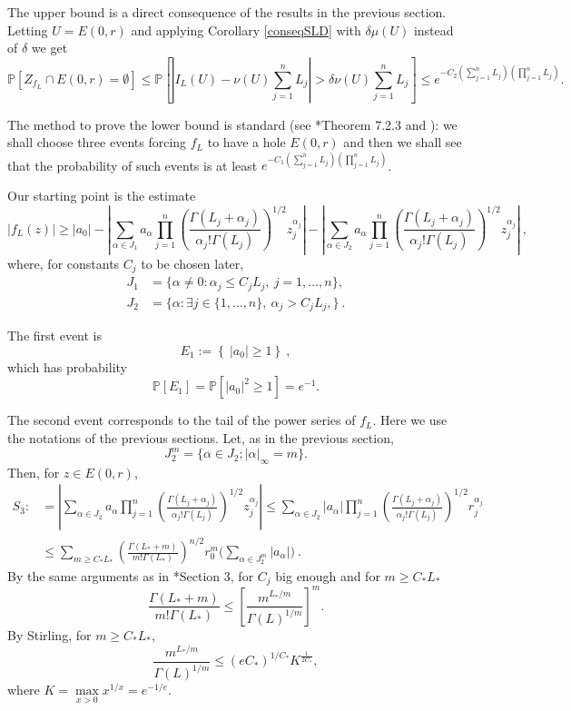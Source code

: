 \documentclass[12pt,twoside,final,amsfonts]{amsart}
\theoremstyle{plain}
\theoremstyle{definition}
\theoremstyle{definition}
\begin{document}
The upper bound is a direct consequence of the results in the previous section. Letting $U=E(0,r)$ and applying Corollary \ref{conseqSLD} with $\delta\mu(U)$ instead of $\delta$ we get
\[
 \mathbb P\left[Z_{f_L}\cap E(0,r)=\emptyset\right]\leq\mathbb P\left[|I_L(U)- \nu(U){\sum_{j=1}^n L_j}|>\delta \nu(U){\sum_{j=1}^n L_j} \right]\leq e^{-C_{2}{(\sum_{j=1}^n L_j)(\prod_{j=1}^n L_j)}}.
\]

The method to prove the lower bound is standard (see \cite{HKPV}*{Theorem 7.2.3} and \cite{ST1}): we shall choose three events forcing $f_L$ to have a hole $E(0,r)$ and then we shall see that the probability of such events is at least $e^{-C_{1}{(\sum_{j=1}^n L_j)(\prod_{j=1}^n L_j)}}$. 

Our starting point is the estimate
\[
 |f_L(z)|\geq |a_0|-\left|\sum_{\alpha\in J_1} a_\alpha\prod_{j=1}^n \left(\frac{\Gamma(L_j+\alpha_j)}{\alpha_j! \Gamma(L_j)}\right)^{1/2} z_j^{\alpha_j}\right|-
 \left|\sum_{\alpha\in J_2} a_\alpha\prod_{j=1}^n \left(\frac{\Gamma(L_j+\alpha_j)}{\alpha_j! \Gamma(L_j)}\right)^{1/2} z_j^{\alpha_j}\right|\ ,
\]
where, for constants $C_j$ to be chosen later, 
\begin{align*}
 J_1&=\bigl\{\alpha\neq 0 : \alpha_j\leq C_j L_j,\ j=1,\dots,n \bigr\}, \\
 J_2&=\bigl\{\alpha  : \exists j\in\{1,\dots,n\},\ \alpha_j> C_j L_j, \bigr\}\ .
\end{align*}

The first event is
\[
 E_1:=\left\{\ |a_0|\geq 1\right\}\ ,
\]
which has probability
\[
\mathbb P[E_1]=\mathbb P[|a_0|^2\geq 1]=e^{-1}.
\]

The second event corresponds to the tail of the power series of $f_L$. Here we use the notations of the previous sections. Let, as in the previous section, 
\[
 J_2^m=\{\alpha\in J_2 ; |\alpha|_\infty=m\} .
\]
Then, for $z\in E(0,r)$,
\begin{align*}
 S_3:&=\left|\sum_{\alpha\in J_2} a_\alpha \prod_{j=1}^n \left(\frac{\Gamma(L_j+\alpha_j)}{\alpha_j! \Gamma(L_j)}\right)^{1/2} z_j^{\alpha_j}\right| \leq \sum_{\alpha\in J_2} |a_\alpha| \prod_{j=1}^n \left(\frac{\Gamma(L_j+\alpha_j)}{\alpha_j! \Gamma(L_j)}\right)^{1/2} r_j^{\alpha_j}\\
 &\leq\sum_{m\geq C_* L_*} \left(\frac{\Gamma(L_*+m)}{m!\Gamma(L_*)}\right)^{n/2} r_0^m \bigl(\sum_{\alpha\in J_2^m} |a_\alpha|\bigr) \ .
\end{align*}
By the same arguments as in \cite{BMP}*{Section 3}, for $ C_j$ big enough and for $m\geq C_*L_*$
\[
 \frac{\Gamma(L_*+m)}{m! \Gamma(L_*)}\leq \left[\frac{m^{L_*/m}}{\Gamma(L)^{1/m}}\right]^m .
\]
By Stirling, for $m\geq C_*L_*$,
\[
 \frac{m^{L_*/m}}{\Gamma(L)^{1/m}}\leq (eC_*)^{1/C_*} K^{\frac 1{2C_*}},
\]
where $K=\max\limits_{x>0} x^{1/x}= e^{-1/e}$.
\end{document}
